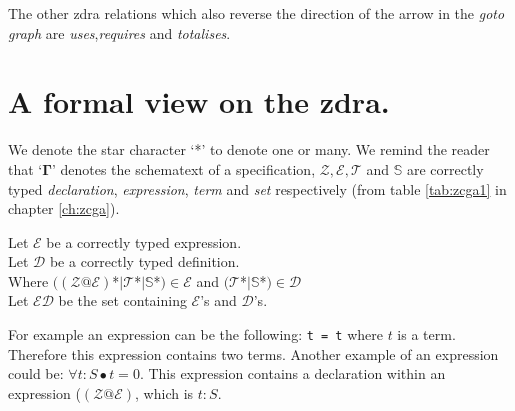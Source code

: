 The other \gls{zdra} relations which also reverse the direction of the arrow in
the \emph{goto graph} are \emph{uses},\emph{requires} and \emph{totalises}.

\section{A formal view on the \gls{zdra}.}

We denote the star character `*' to denote one or many. We remind the reader
that `$\mathbf{\Gamma}$' denotes the schematext of a specification,
$\mathcal{Z}, \mathcal{E}, \mathcal{T}$ and $\mathbb{S}$ are correctly typed
\emph{declaration}, \emph{expression}, \emph{term} and \emph{set} respectively
(from table \ref{tab:zcga1} in chapter \ref{ch:zcga}).

\begin{defin}
Let $\mathcal{E}$ be a correctly typed expression. \\ Let $\mathcal{D}$ be a
correctly typed definition. \\
Where $((\mathcal{Z}@\mathcal{E})$*$|\mathcal{T}$*$|\mathbb{S}$*$) \in
\mathcal{E}$ and $(\mathcal{T}$*$|\mathbb{S}$*$) \in \mathcal{D}$\\
Let $\mathcal{ED}$ be the set containing $\mathcal{E}$'s and $\mathcal{D}$'s.
\end{defin}

For example an expression can be the following: \verb|t = t| where $t$ is a
term. Therefore this expression contains two terms. Another example of an
expression could be: $\forall t: S \bullet t = 0$. This expression contains a
declaration within an expression ($(\mathcal{Z}@\mathcal{E})$, which is $t:S$.



